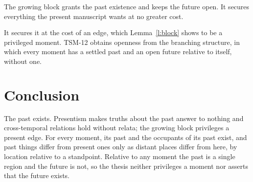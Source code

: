 \documentclass{situationist-preprint}
\begin{document}
\begin{objection}\label{o:block}
The growing block grants the past existence and keeps the future open. It secures everything the present manuscript wants at no greater cost.
\end{objection}

\begin{reply}
It secures it at the cost of an edge, which Lemma~\ref{l:block} shows to be a privileged moment. TSM-12 obtains openness from the branching structure, in which every moment has a settled past and an open future relative to itself, without one.
\end{reply}

\section{Conclusion}

The past exists. Presentism makes truths about the past answer to nothing and cross-temporal relations hold without relata; the growing block privileges a present edge. For every moment, its past and the occupants of its past exist, and past things differ from present ones only as distant places differ from here, by location relative to a standpoint. Relative to any moment the past is a single region and the future is not, so the thesis neither privileges a moment nor asserts that the future exists.
\end{document}
